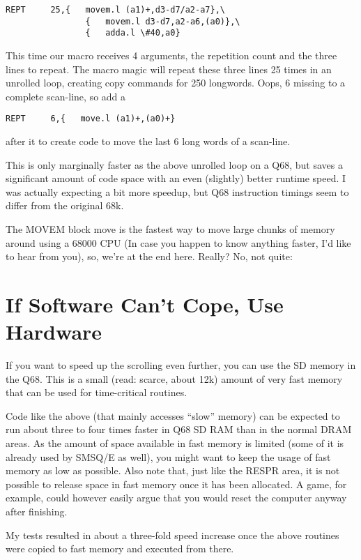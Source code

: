 \begin{lstlisting}[firstnumber=1,caption={Improving the REPT macro}]
    REPT     25,{   movem.l (a1)+,d3-d7/a2-a7},\
                {   movem.l d3-d7,a2-a6,(a0)},\
                {   adda.l \#40,a0}
\end{lstlisting}

This time our macro receives 4 arguments, the repetition count and the
three lines to repeat. The macro magic will repeat these three lines 25
times in an unrolled loop, creating copy commands for 250 longwords.
Oops, 6 missing to a complete scan-line, so add a

\begin{lstlisting}[firstnumber=1,caption={Scrolling one pixel leftwards}]
    REPT     6,{   move.l (a1)+,(a0)+}
\end{lstlisting}

after it to create code to move the last 6 long words of a scan-line.

This is only marginally faster as the above unrolled loop on a Q68, but
saves a significant amount of code space with an even (slightly) better
runtime speed. I was actually expecting a bit more speedup, but Q68
instruction timings seem to differ from the original 68k.

The MOVEM block move is the fastest way to move large chunks of memory
around using a 68000 CPU (In case you happen to know anything faster,
I'd like to hear from you), so, we're at the end here. Really? No, not
quite:

\section{If Software Can't Cope, Use Hardware}

If you want to speed up the scrolling even further, you can use the SD
memory in the Q68. This is a small (read: scarce, about 12k) amount of
very fast memory that can be used for time-critical routines.

Code like the above (that mainly accesses ``slow'' memory) can be
expected to run about three to four times faster in Q68 SD RAM than in
the normal DRAM areas. As the amount of space available in fast memory
is limited (some of it is already used by SMSQ/E as well), you might
want to keep the usage of fast memory as low as possible. Also note
that, just like the RESPR area, it is not possible to release space in
fast memory once it has been allocated. A game, for example, could however
easily argue that you would reset the computer anyway after finishing.

My tests resulted in about a three-fold speed increase once the above
routines were copied to fast memory and executed from there.

